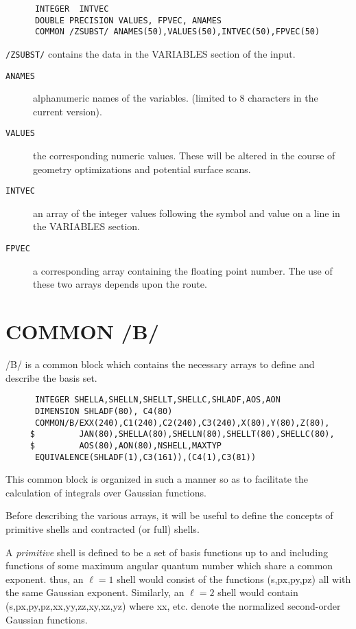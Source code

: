 \subsubsection{}
\begin{verbatim}
      INTEGER  INTVEC
      DOUBLE PRECISION VALUES, FPVEC, ANAMES
      COMMON /ZSUBST/ ANAMES(50),VALUES(50),INTVEC(50),FPVEC(50)
\end{verbatim}
{\tt /ZSUBST/} contains the data in the VARIABLES section of
the input.
\begin{description}
\item[{\tt ANAMES}]  alphanumeric names of the variables.
(limited to 8 characters in the current
version).
\item[{\tt VALUES}]  the corresponding numeric values.  These
will be altered in the course of
geometry optimizations and potential
surface scans.
\item[{\tt INTVEC}]  an array of the integer values following
the symbol and value on a line in the
VARIABLES section.
\item[{\tt FPVEC}]   a corresponding array containing the
floating point number.  The use of these
two arrays depends upon the route.
\end{description}
\newpage
\section{\sf COMMON /B/}
/B/ is a common block which contains the necessary arrays
to define and describe the basis set.  
{\small
\begin{verbatim}
      INTEGER SHELLA,SHELLN,SHELLT,SHELLC,SHLADF,AOS,AON
      DIMENSION SHLADF(80), C4(80)
      COMMON/B/EXX(240),C1(240),C2(240),C3(240),X(80),Y(80),Z(80),
     $         JAN(80),SHELLA(80),SHELLN(80),SHELLT(80),SHELLC(80),
     $         AOS(80),AON(80),NSHELL,MAXTYP
      EQUIVALENCE(SHLADF(1),C3(161)),(C4(1),C3(81))
\end{verbatim}
}
This common block is organized in such a manner so as to
facilitate the calculation of integrals over Gaussian
functions.

Before  describing the various arrays,
it will be useful to define the concepts of primitive shells
and contracted (or full) shells.

A {\em primitive} shell is defined to be a set of basis functions
up to and including functions of some maximum angular
quantum number which share a common exponent.  thus,
an $\ell = 1 $ shell would consist of the functions (s,px,py,pz)
all with the same Gaussian exponent.  Similarly, an $\ell = 2$
shell would contain (s,px,py,pz,xx,yy,zz,xy,xz,yz) where
xx, etc. denote the normalized second-order Gaussian
functions.

